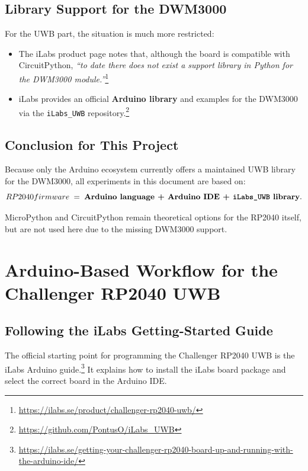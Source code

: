 \documentclass[a4paper,11pt]{article}
\begin{document}
\subsection{Library Support for the DWM3000}

For the UWB part, the situation is much more restricted:

\begin{itemize}
	\item The iLabs product page notes that, although the board is compatible with CircuitPython, \emph{“to date there does not exist a support library in Python for the DWM3000 module.”}\footnote{\url{https://ilabs.se/product/challenger-rp2040-uwb/}}
	\item iLabs provides an official \textbf{Arduino library} and examples for the DWM3000 via the \texttt{iLabs\_UWB} repository.\footnote{\url{https://github.com/PontusO/iLabs_UWB}}
\end{itemize}

\subsection{Conclusion for This Project}

Because only the Arduino ecosystem currently offers a maintained UWB library for the DWM3000, all experiments in this document are based on:
\[
{RP2040 firmware} \;=\; \textbf{Arduino language + Arduino IDE + \texttt{iLabs\_UWB} library}.
\]

MicroPython and CircuitPython remain theoretical options for the RP2040 itself, but are not used here due to the missing DWM3000 support.

	
	
	
	
\newpage
	
\section{Arduino-Based Workflow for the Challenger RP2040 UWB}
\label{sec:arduino-workflow}

\subsection{Following the iLabs Getting-Started Guide}
\label{subsec:ilabs-guide}

The official starting point for programming the Challenger RP2040 UWB is the iLabs
Arduino guide.\footnote{\url{https://ilabs.se/getting-your-challenger-rp2040-board-up-and-running-with-the-arduino-ide/}}
It explains how to install the iLabs board package and select the correct board in the Arduino IDE.
\end{document}
